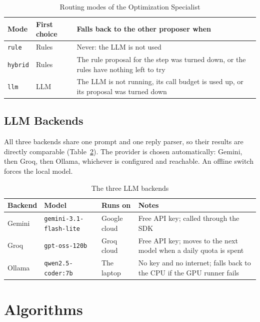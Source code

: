 \documentclass[12pt,a4paper]{report}
\begin{document}
\begin{table}[H]
\centering
\caption{Routing modes of the Optimization Specialist}
\label{tab:routing}
\begin{tabularx}{\textwidth}{|l|l|X|}
\hline
\textbf{Mode} & \textbf{First choice} & \textbf{Falls back to the other proposer when} \\
\hline
\texttt{rule} & Rules & Never: the LLM is not used \\
\hline
\texttt{hybrid} & Rules & The rule proposal for the step was turned down, or the rules have nothing left to try \\
\hline
\texttt{llm} & LLM & The LLM is not running, its call budget is used up, or its proposal was turned down \\
\hline
\end{tabularx}
\end{table}

\subsection{LLM Backends}

All three backends share one prompt and one reply parser, so their results are directly comparable (Table~\ref{tab:backends}). The provider is chosen automatically: Gemini, then Groq, then Ollama, whichever is configured and reachable. An offline switch forces the local model.

\begin{table}[H]
\centering
\caption{The three LLM backends}
\label{tab:backends}
\small
\begin{tabularx}{\textwidth}{|l|l|l|X|}
\hline
\textbf{Backend} & \textbf{Model} & \textbf{Runs on} & \textbf{Notes} \\
\hline
Gemini & \texttt{gemini-3.1-flash-lite} & Google cloud & Free API key; called through the SDK \\
\hline
Groq & \texttt{gpt-oss-120b} & Groq cloud & Free API key; moves to the next model when a daily quota is spent \\
\hline
Ollama & \texttt{qwen2.5-coder:7b} & The laptop & No key and no internet; falls back to the CPU if the GPU runner fails \\
\hline
\end{tabularx}
\end{table}

\section{Algorithms}
\end{document}
